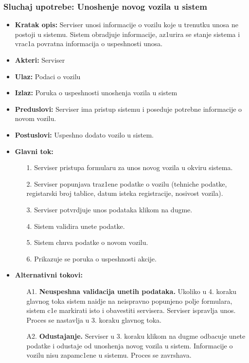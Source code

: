 \subsubsection{Sluchaj upotrebe: Unoshenje novog vozila u sistem}
\begin{itemize}
\item{\textbf{Kratak opis:} Serviser unosi informacije o vozilu koje u trenutku unosa ne postoji u sistemu. Sistem obradjuje informacije, az1urira se stanje sistema i vrac1a povratna informacija o uspeshnosti unosa.}
\item{\textbf{Akteri:} Serviser}
\item{\textbf{Ulaz:} Podaci o vozilu }
\item{\textbf{Izlaz:} Poruka o uspeshnosti unoshenja vozila u sistem }
\item{\textbf{Preduslovi:} Serviser ima pristup sistemu i poseduje potrebne informacije o novom vozilu. }
\item{\textbf{Postuslovi:} Uspeshno dodato vozilo u sistem.}
\item{\textbf{Glavni tok:} 
\begin{enumerate}
    \item [1.] Serviser pristupa formularu za unos novog vozila u okviru sistema.
    \item[2.] Serviser popunjava traz1ene podatke o vozilu (tehniche podatke, registarski broj tablice, datum isteka registracije, nosivost vozila).
    \item[3.] Serviser potvrdjuje unos podataka klikom na dugme.
    \item[4.] Sistem validira unete podatke.
    \item[5.] Sistem chuva podatke o novom vozilu.
    \item[6.] Prikazuje se poruka o uspeshnosti akcije.
\end{enumerate}

}
\item{\textbf{Alternativni tokovi:} 
\begin{enumerate}
    \item [A1.] \textbf{Neuspeshna validacija unetih podataka.} Ukoliko u 4. koraku glavnog toka sistem naidje na neispravno popunjeno polje formulara, sistem c1e markirati isto i obavestiti servisera. Serviser ispravlja unos. Proces se nastavlja u 3. koraku glavnog toka.
    \item[A2.] \textbf{Odustajanje.} Serviser u 3. koraku klikom na dugme odbacuje unete podatke i odustaje od unoshenja novog vozila u sistem. Informacije o vozilu nisu zapamc1ene u sistemu. Proces se zavrshava.
\end{enumerate}
}
\end{itemize}

